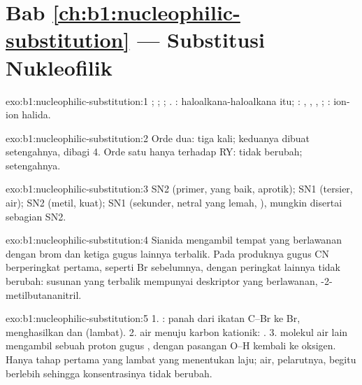 \section*{Bab \ref{ch:b1:nucleophilic-substitution} --- Substitusi Nukleofilik}

\begin{solution}{exo:b1:nucleophilic-substitution:1}
; ; ;
. : haloalkana-haloalkana itu; :
, , , ; : ion-ion halida.
\end{solution}

\begin{solution}{exo:b1:nucleophilic-substitution:2}
Orde dua: tiga kali; keduanya dibuat setengahnya, dibagi 4. Orde satu
hanya terhadap RY: tidak berubah; setengahnya.
\end{solution}

\begin{solution}{exo:b1:nucleophilic-substitution:3}
SN2 (primer,  yang baik, aprotik); SN1 (tersier, air); SN2
(metil,  kuat);  SN1 (sekunder,  netral yang
lemah, ), mungkin disertai sebagian SN2.
\end{solution}

\begin{solution}{exo:b1:nucleophilic-substitution:4}
Sianida mengambil tempat yang berlawanan dengan brom dan ketiga gugus
lainnya terbalik. Pada produknya gugus CN berperingkat pertama, seperti
Br sebelumnya, dengan peringkat lainnya tidak berubah: susunan yang
terbalik mempunyai deskriptor yang berlawanan,
-2-metilbutananitril.
\end{solution}

\begin{solution}{exo:b1:nucleophilic-substitution:5}
1. : panah dari ikatan C--Br ke Br, menghasilkan
 dan  (lambat). 2.  air
menuju karbon kationik: . 3. 
molekul air lain mengambil sebuah proton gugus , dengan pasangan
O--H kembali ke oksigen. Hanya tahap pertama yang lambat yang menentukan
laju; air, pelarutnya, begitu berlebih sehingga konsentrasinya tidak
berubah.
\end{solution}

